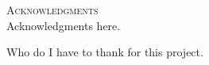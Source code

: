 
\noindent
\begin{singlespace}
{\parindent0pt
	{\large \textsc{Acknowledgments}} \\

	Acknowledgments here.

	Who do I have to thank for this project.
}

\end{singlespace}

\newpage
\null
\thispagestyle{empty}
\newpage
